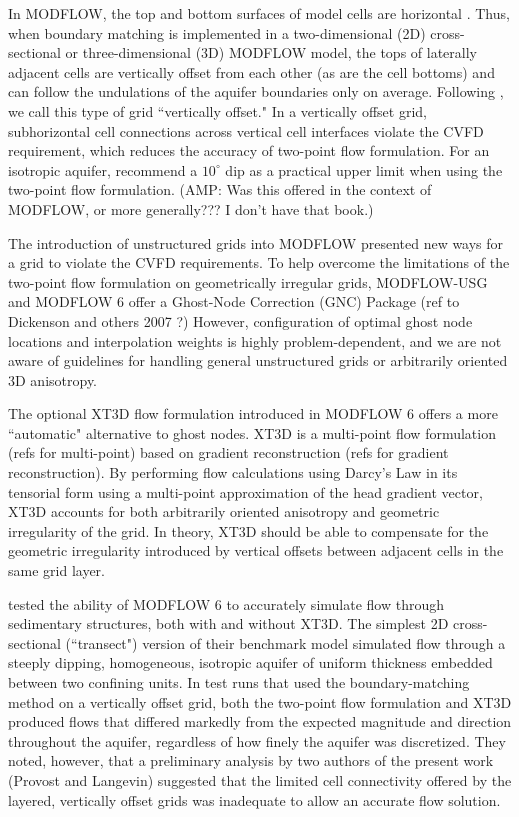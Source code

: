 \documentclass{article}
\begin{document}
In MODFLOW, the top and bottom surfaces of model cells are horizontal \citep{modflow6gwf}. Thus, when boundary matching is implemented in a two-dimensional (2D) cross-sectional or three-dimensional (3D) MODFLOW model, the tops of laterally adjacent cells are vertically offset from each other (as are the cell bottoms) and can follow the undulations of the aquifer boundaries only on average. Following \cite{bardot2022}, we call this type of grid ``vertically offset." In a vertically offset grid, subhorizontal cell connections across vertical cell interfaces violate the CVFD requirement, which reduces the accuracy of two-point flow formulation. For an isotropic aquifer, \cite{anderson2015applied} recommend a $10^{\circ}$ dip as a practical upper limit when using the two-point flow formulation. {\color{red} (AMP: Was this offered in the context of MODFLOW, or more generally??? I don't have that book.)}

The introduction of unstructured grids into MODFLOW \citep{modflowusg, modflow6gwf} presented new ways for a grid to violate the CVFD requirements. To help overcome the limitations of the two-point flow formulation on geometrically irregular grids, MODFLOW-USG and MODFLOW 6 offer a Ghost-Node Correction (GNC) Package \citep{modflowusg, modflow6gwf}{\color{red} (ref to Dickenson and others 2007 ?)} However, configuration of optimal ghost node locations and interpolation weights is highly problem-dependent, and we are not aware of guidelines for handling general unstructured grids or arbitrarily oriented 3D anisotropy.

The optional XT3D flow formulation \citep{modflow6xt3d} introduced in MODFLOW 6 offers a more ``automatic" alternative to ghost nodes. XT3D is a multi-point flow formulation {\color{red} (refs for multi-point)} based on gradient reconstruction {\color{red} (refs for gradient reconstruction)}. By performing flow calculations using Darcy's Law in its tensorial form using a multi-point approximation of the head gradient vector, XT3D accounts for both arbitrarily oriented anisotropy and geometric irregularity of the grid. In theory, XT3D should be able to compensate for the geometric irregularity introduced by vertical offsets between adjacent cells in the same grid layer.

\cite{bardot2022} tested the ability of MODFLOW 6 to accurately simulate flow through sedimentary structures, both with and without XT3D. The simplest 2D cross-sectional (``transect") version of their benchmark model simulated flow through a steeply dipping, homogeneous, isotropic aquifer of uniform thickness embedded between two confining units. In test runs that used the boundary-matching method on a vertically offset grid, both the two-point flow formulation and XT3D produced flows that differed markedly from the expected magnitude and direction throughout the aquifer, regardless of how finely the aquifer was discretized. They noted, however, that a preliminary analysis by two authors of the present work (Provost and Langevin) suggested that the limited cell connectivity offered by the layered, vertically offset grids was inadequate to allow an accurate flow solution.
\end{document}
